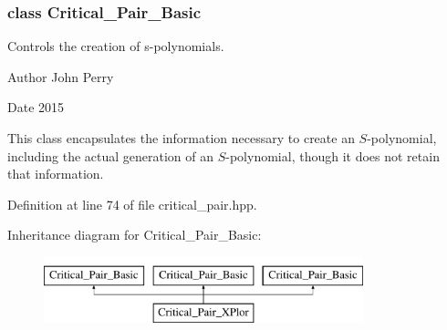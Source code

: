 \subsubsection{class Critical\+\_\+\+Pair\+\_\+\+Basic}
Controls the creation of s-\/polynomials. 

\begin{DoxyAuthor}{Author}
John Perry 
\end{DoxyAuthor}
\begin{DoxyDate}{Date}
2015
\end{DoxyDate}
This class encapsulates the information necessary to create an $S$-\/polynomial, including the actual generation of an $S$-\/polynomial, though it does not retain that information. 

Definition at line 74 of file critical\+\_\+pair.\+hpp.

Inheritance diagram for Critical\+\_\+\+Pair\+\_\+\+Basic\+:\begin{figure}[H]
\begin{center}
\leavevmode
\includegraphics[height=1.917808cm]{group___g_b_computation}
\end{center}
\end{figure}
